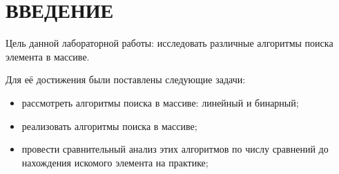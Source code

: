 \part*{ВВЕДЕНИЕ}
Цель данной лабораторной работы: исследовать различные алгоритмы поиска элемента в массиве.

Для её достижения были поставлены следующие задачи:
\begin{itemize}
	\item рассмотреть алгоритмы поиска в массиве: линейный и бинарный;
	\item реализовать алгоритмы поиска в массиве;
	\item провести сравнительный анализ этих алгоритмов по числу сравнений до
нахождения искомого элемента на практике;
\end{itemize}